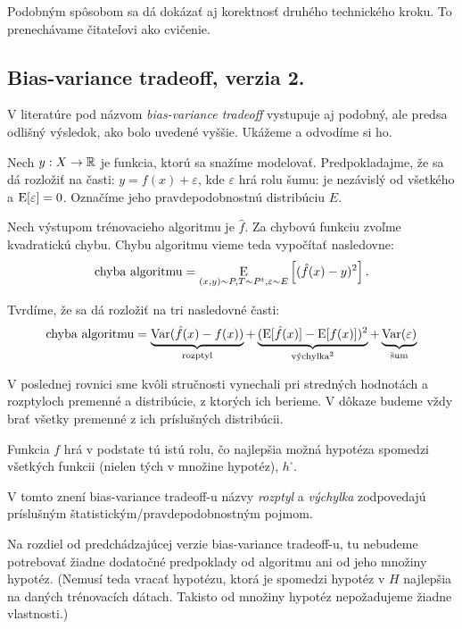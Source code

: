 Podobným spôsobom sa dá dokázať aj korektnosť druhého technického
kroku. To prenechávame čitateľovi ako cvičenie.



\subsection{Bias-variance tradeoff, verzia 2.}
V literatúre pod názvom \emph{bias-variance tradeoff} vystupuje aj
podobný, ale predsa odlišný výsledok, ako bolo uvedené vyššie.
Ukážeme a odvodíme si ho.

\begin{theorem}
  Nech $y : X \to \mathbb{R}$ je funkcia, ktorú sa snažíme modelovať.
  Predpokladajme, že sa dá rozložiť na časti: $y = f(x) + \varepsilon$,
  kde $\varepsilon$ hrá rolu šumu: je nezávislý od všetkého a
  $\operatorname*{\mathrm{E}}[\varepsilon] = 0$. Označíme jeho pravdepodobnostnú distribúciu
  $E$.
  
  Nech výstupom trénovacieho algoritmu je $\hat{f}$. Za chybovú
  funkciu zvoľme kvadratickú chybu. Chybu algoritmu vieme teda
  vypočítať nasledovne:
  $$\text{\normalfont chyba algoritmu} = \operatorname*{\mathrm{E}}_{(x, y) \sim P, T \sim P^t, \varepsilon \sim E} \left[ (\hat{f}(x) - y)^2 \right].$$
  
  Tvrdíme, že sa dá rozložiť na tri nasledovné časti:
  $$
  \text{\normalfont chyba algoritmu}
      = \underbrace{\operatorname*{\mathrm{Var}}(\hat{f}(x) - f(x))}_{\text{\normalfont rozptyl}}
      + \underbrace{(\operatorname*{\mathrm{E}}[\hat{f}(x)] - \operatorname*{\mathrm{E}}[f(x)])^2}_{\text{\normalfont výchylka}^2}
      + \underbrace{\operatorname*{\mathrm{Var}}(\varepsilon)}_{\text{\normalfont šum}}
  $$
\end{theorem}
\begin{remark}
  V poslednej rovnici sme kvôli stručnosti vynechali pri stredných
  hodnotách a rozptyloch premenné a distribúcie, z ktorých ich berieme.
  V dôkaze budeme vždy brať všetky premenné z ich príslušných distribúcii.
\end{remark}
\begin{remark}
  Funkcia $f$ hrá v podstate tú istú rolu, čo najlepšia možná hypotéza
  spomedzi všetkých funkcii (nielen tých v množine hypotéz), $h^\square$.
\end{remark}
\begin{remark}
  V tomto znení bias-variance tradeoff-u názvy \emph{rozptyl} a
  \emph{výchylka} zodpovedajú príslušným štatistickým/pravdepodobnostným
  pojmom.
\end{remark}
\begin{remark}
  Na rozdiel od predchádzajúcej verzie bias-variance tradeoff-u, tu
  nebudeme potrebovať žiadne dodatočné predpoklady od algoritmu ani
  od jeho množiny hypotéz. (Nemusí teda vracať hypotézu, ktorá je
  spomedzi hypotéz v $H$ najlepšia na daných trénovacích dátach.
  Takisto od množiny hypotéz nepožadujeme žiadne vlastnosti.)
\end{remark}
